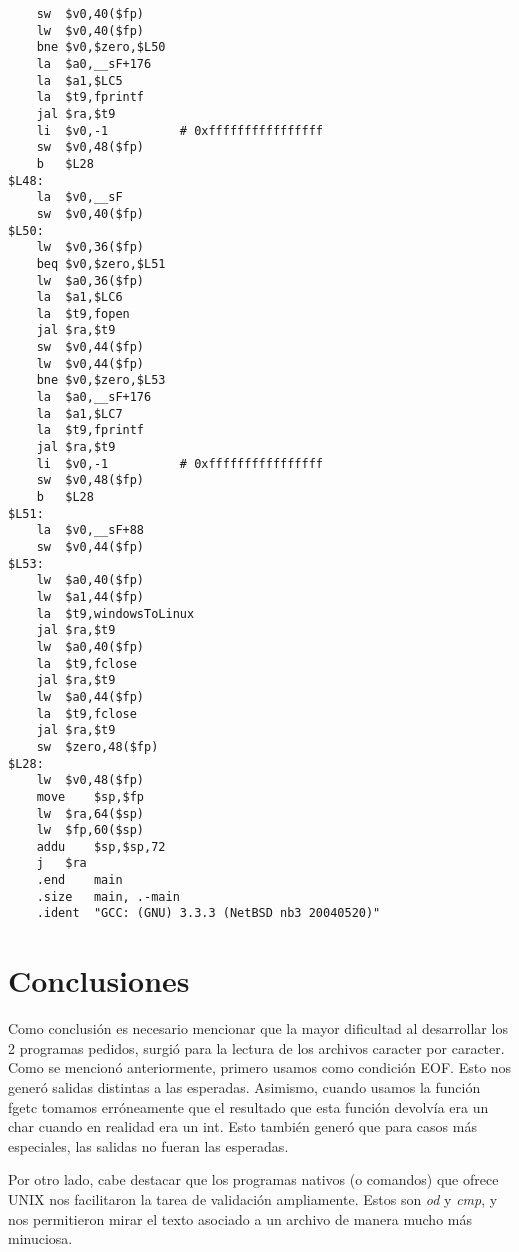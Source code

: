 \documentclass[a4paper,11pt]{article}
\begin{document}
\begin{verbatim}
	sw	$v0,40($fp)
	lw	$v0,40($fp)
	bne	$v0,$zero,$L50
	la	$a0,__sF+176
	la	$a1,$LC5
	la	$t9,fprintf
	jal	$ra,$t9
	li	$v0,-1			# 0xffffffffffffffff
	sw	$v0,48($fp)
	b	$L28
$L48:
	la	$v0,__sF
	sw	$v0,40($fp)
$L50:
	lw	$v0,36($fp)
	beq	$v0,$zero,$L51
	lw	$a0,36($fp)
	la	$a1,$LC6
	la	$t9,fopen
	jal	$ra,$t9
	sw	$v0,44($fp)
	lw	$v0,44($fp)
	bne	$v0,$zero,$L53
	la	$a0,__sF+176
	la	$a1,$LC7
	la	$t9,fprintf
	jal	$ra,$t9
	li	$v0,-1			# 0xffffffffffffffff
	sw	$v0,48($fp)
	b	$L28
$L51:
	la	$v0,__sF+88
	sw	$v0,44($fp)
$L53:
	lw	$a0,40($fp)
	lw	$a1,44($fp)
	la	$t9,windowsToLinux
	jal	$ra,$t9
	lw	$a0,40($fp)
	la	$t9,fclose
	jal	$ra,$t9
	lw	$a0,44($fp)
	la	$t9,fclose
	jal	$ra,$t9
	sw	$zero,48($fp)
$L28:
	lw	$v0,48($fp)
	move	$sp,$fp
	lw	$ra,64($sp)
	lw	$fp,60($sp)
	addu	$sp,$sp,72
	j	$ra
	.end	main
	.size	main, .-main
	.ident	"GCC: (GNU) 3.3.3 (NetBSD nb3 20040520)"
\end{verbatim}

\section{Conclusiones}
Como conclusi\'on es necesario mencionar que la mayor dificultad al desarrollar los 2 programas pedidos, surgi\'o para la lectura de los archivos caracter por caracter. Como se mencion\'o anteriormente, primero usamos como condici\'on EOF. Esto nos gener\'o salidas distintas a las esperadas. Asimismo, cuando usamos la funci\'on fgetc tomamos erróneamente que el resultado que esta funci\'on devolv\'ia era un char cuando en realidad era un int. Esto tambi\'en gener\'o que para casos m\'as especiales, las salidas no fueran las esperadas.

Por otro lado, cabe destacar que los programas nativos (o comandos) que ofrece UNIX nos facilitaron la tarea de validación ampliamente. Estos son  \textit{od} y  \textit{cmp}, y nos permitieron mirar el texto asociado a un archivo de manera mucho más minuciosa.
\end{document}
